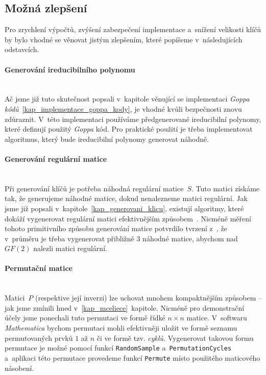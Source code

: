 \documentclass[thesis=M,czech,hidelinks]{FITthesis}[2012/06/26]
\newcommand{\0}{{\textcolor[gray]{0.75}{0}}}
\begin{document}
\subsection{Možná zlepšení}\label{kap_mceliece_zlepseni}

Pro zrychlení výpočtů, zvýšení zabezpečení implementace a~snížení velikosti
klíčů by bylo vhodné se věnovat jistým zlepšením, které popíšeme v~následujících
odstavcích.


\paragraph{Generování ireducibilního polynomu} \hfil \\
Ač jsme již tuto skutečnost popsali v~kapitole věnující se implementaci
\emph{Goppa kódů}~\ref{kap_implementace_goppa_kody}, je vhodné kvůli bezpečnosti
znovu zdůraznit. V~této implementaci používáme předgenerované ireducibilní
polynomy, které definují použitý \emph{Goppa} kód. Pro praktické použití je
třeba implementovat algoritmus, který bude ireducibilní polynomy generovat
náhodně.


\paragraph{Generování regulární matice} \hfil \\
Při generování klíčů je potřeba náhodná regulární matice~$S$. Tuto matici
získáme tak, že generujeme náhodné matice, dokud nenalezneme matici regulární.
Jak jsme již popsali v~kapitole~\ref{kap_generovani_klicu}, existují algoritmy,
které dokáží vygenerovat regulární matici efektivnějším způsobem~\cite{Randall}.
Nicméně měření tohoto primitivního způsobu generování matice potvrdilo tvrzení
z~\cite{Heyse}, že v~průměru je třeba vygenerovat přibližně 3 náhodné matice,
abychom nad $GF(2)$ nalezli matici regulární.


\paragraph{Permutační matice} \hfil \\
Matici~$P$ (respektive její inverzi) lze uchovat mnohem kompaktnějším způsobem
-- jak jsme zmínili hned v~\ref{kap_mceliece}~kapitole. Nicméně pro demonstrační
účely jsme ponechali tuto permutaci ve formě řídké $n \times n$ matice.
V~softwaru \emph{Mathematica} bychom permutaci mohli efektivněji uložit ve formě
seznamu permutovaných prvků $1$ až $n$ či ve formě tzv. \emph{cyklů}.
Vygenerovat takovou formu permutace je možné pomocí funkcí \texttt{RandomSample}
a~\texttt{PermutationCycles} a~aplikaci této permutace provedeme funkcí
\texttt{Permute} místo použitého maticového násobení.
\end{document}
